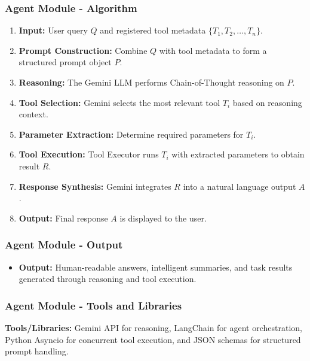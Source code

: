\documentclass{beamer}
\begin{document}
\begin{frame}
\frametitle{Agent Module - Algorithm}
\begin{enumerate}
    \item \textbf{Input:} User query $Q$ and registered tool metadata $\{T_1, T_2, \ldots, T_n\}$.
    \item \textbf{Prompt Construction:} Combine $Q$ with tool metadata to form a structured prompt object $P$.
    \item \textbf{Reasoning:} The Gemini LLM performs Chain-of-Thought reasoning on $P$.
    \item \textbf{Tool Selection:} Gemini selects the most relevant tool $T_i$ based on reasoning context.
    \item \textbf{Parameter Extraction:} Determine required parameters for $T_i$.
    \item \textbf{Tool Execution:} Tool Executor runs $T_i$ with extracted parameters to obtain result $R$.
    \item \textbf{Response Synthesis:} Gemini integrates $R$ into a natural language output $A$.
    \item \textbf{Output:} Final response $A$ is displayed to the user.
\end{enumerate}
\end{frame}

\begin{frame}
\frametitle{Agent Module - Output}
\begin{itemize}
    \item \textbf{Output:} Human-readable answers, intelligent summaries, and task results generated through reasoning and tool execution.
\end{itemize}
\end{frame}

\begin{frame}
\frametitle{Agent Module - Tools and Libraries}
\textbf{Tools/Libraries:} Gemini API for reasoning, LangChain for agent orchestration, Python Asyncio for concurrent tool execution, and JSON schemas for structured prompt handling.
\end{frame}
\end{document}
